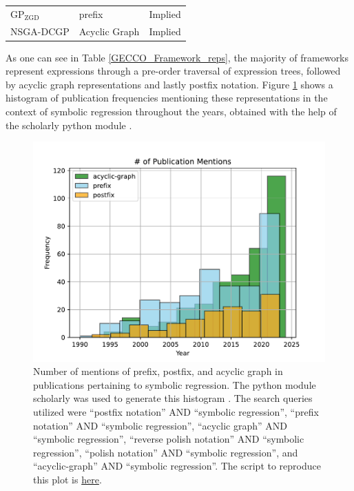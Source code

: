 \documentclass[runningheads]{llncs}
\begin{document}
\begin{table}
\begin{tabular*}{\textwidth}{lll}
$\mathrm{GP}_{\mathrm{ZGD}}$ \cite{10.1145/3377930.3390237} & prefix & Implied\\ %
NSGA-DCGP \cite{izzo2016differentiable} & Acyclic Graph & Implied \\%
\hline 
\end{tabular*}
\end{table}

As one can see in Table \ref{GECCO_Framework_reps}, the majority of frameworks represent expressions through a pre-order traversal of expression trees, followed by acyclic graph representations and lastly postfix notation.
Figure \ref{fig:pub_freqs_pre_post_acyc_graph} shows a histogram of publication frequencies mentioning these representations in the context of symbolic regression throughout the years, obtained with the help of the scholarly python module \cite{cholewiak2021scholarly}.  %

\begin{figure}
    \centering
    \includegraphics[width=\linewidth]{pub_freqs.pdf}
    \caption{Number of mentions of prefix, postfix, and acyclic graph in publications pertaining to symbolic regression. The python module scholarly was used to generate this histogram \cite{cholewiak2021scholarly}. The search queries utilized were ``postfix notation'' AND ``symbolic regression'', ``prefix notation'' AND ``symbolic regression'', ``acyclic graph'' AND ``symbolic regression'', ``reverse polish notation'' AND ``symbolic regression'', ``polish notation'' AND ``symbolic regression'', and ``acyclic-graph'' AND ``symbolic regression''. The script to reproduce this plot is \href{https://github.com/edfink234/Alpha-Zero-Symbolic-Regression/blob/d5ebdf90c0915cd5769b29bf679709dbd4a618c7/Figure_1/notations_pubs_counter.py}{here}.} 
    \label{fig:pub_freqs_pre_post_acyc_graph}
\end{figure}
\end{document}
